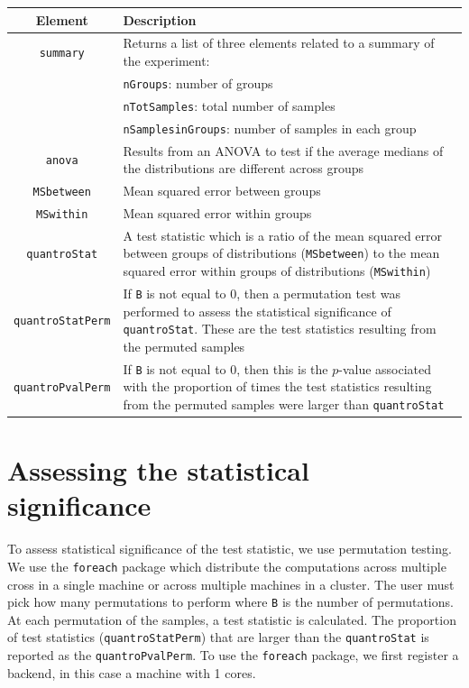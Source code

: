 \documentclass{article}\usepackage[]{graphicx}\usepackage[usenames,dvipsnames]{color}
\begin{document}
\begin{table}[h]
\begin{center}
\begin{tabular}{|c|p{4.5in}|}
\hline
Element & Description \\
\hline
\texttt{summary} & Returns a list of three elements related to a 
summary of the experiment: \\
& \hspace{.5in} \texttt{nGroups}: number of groups  \\
& \hspace{.5in} \texttt{nTotSamples}: total number of samples \\
& \hspace{.5in} \texttt{nSamplesinGroups}: number of samples in each group \\
\texttt{anova} & Results from an ANOVA to test if the average medians of 
the distributions are different across groups \\
\texttt{MSbetween} & Mean squared error between groups \\
\texttt{MSwithin} & Mean squared error within groups \\
\texttt{quantroStat} & A test statistic which is a ratio of the mean 
squared error between groups of distributions (\texttt{MSbetween}) to 
the mean squared error within groups of distributions (\texttt{MSwithin}) \\
\texttt{quantroStatPerm} & If \texttt{B} is not equal to 0, then a permutation 
test was performed to assess the statistical significance of 
\texttt{quantroStat}. These are the test statistics resulting from the 
permuted samples \\
\texttt{quantroPvalPerm} & If \texttt{B} is not equal to 0, then this is 
the $p$-value associated with the proportion of times the test statistics 
resulting from the permuted samples were larger than \texttt{quantroStat} \\
\hline
\end{tabular}
\end{center}
\label{tab:output}
\end{table}




\section{Assessing the statistical significance}
To assess statistical significance of the test statistic, we use 
permutation testing.  We use the \texttt{foreach} package which distribute 
the computations across multiple cross in a single machine or across 
multiple machines in a cluster. The user must pick how many permutations 
to perform where \texttt{B} is the number of permutations. At each 
permutation of the samples, a test statistic is calculated. The proportion 
of test statistics (\texttt{quantroStatPerm}) that are larger than the 
\texttt{quantroStat} is reported as the \texttt{quantroPvalPerm}. To use 
the \texttt{foreach} package, we first register a backend, in this case a 
machine with 1 cores. 
\end{document}
